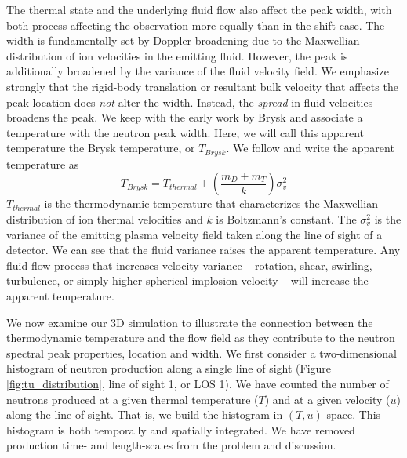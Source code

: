 \documentclass[aip,pop,numerical,reprint,floatfix]{revtex4-1}
\begin{document}
The thermal state and the underlying fluid flow also affect the peak
width, with both process affecting the observation more equally than
in the shift case. The width is fundamentally set by Doppler broadening
due to the Maxwellian distribution of ion velocities in the emitting
fluid. However, the peak is additionally broadened by the variance
of the fluid velocity field. We emphasize strongly that the rigid-body
translation or resultant bulk velocity that affects the peak location
does \textit{not} alter the width. Instead, the \textit{spread} in
fluid velocities broadens the peak. We keep with the early work by
Brysk and associate a temperature with the neutron peak width. Here,
we will call this apparent temperature the Brysk temperature, or $T_{Brysk}$.
We follow \cite{murphy_neut_spectrum} and write the apparent temperature
as
\begin{equation}
T_{Brysk}=T_{thermal}+\left(\frac{m_{D}+m_{T}}{k}\right)\sigma_{v}^{2}\label{eq:brysk_width}
\end{equation}
$T_{thermal}$ is the thermodynamic temperature that characterizes
the Maxwellian distribution of ion thermal velocities and $k$ is
Boltzmann's constant. The $\sigma_{v}^{2}$ is the variance of the
emitting plasma velocity field taken along the line of sight of a
detector. We can see that the fluid variance raises the apparent temperature.
Any fluid flow process that increases velocity variance -- rotation,
shear, swirling, turbulence, or simply higher spherical implosion
velocity -- will increase the apparent temperature.

We now examine our 3D simulation to illustrate the connection between
the thermodynamic temperature and the flow field as they contribute
to the neutron spectral peak properties, location and width. We first
consider a two-dimensional histogram of neutron production along a
single line of sight (Figure \ref{fig:tu_distribution}, line of sight 1,
or LOS 1). We have counted the number of neutrons produced at a given
thermal temperature ($T$) and at a given velocity ($u$) along the
line of sight. That is, we build the histogram in $(T,u)$-space.
This histogram is both temporally and spatially integrated. We have
removed production time- and length-scales from the problem and discussion. 
\end{document}
